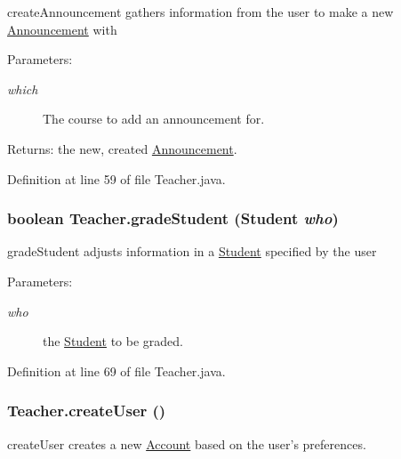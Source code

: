 createAnnouncement gathers information from the user to make a new \hyperlink{classAnnouncement}{Announcement} with 

\begin{Desc}
\item[Parameters:]
\begin{description}
\item[{\em which}]The course to add an announcement for. \end{description}
\end{Desc}
\begin{Desc}
\item[Returns:]the new, created \hyperlink{classAnnouncement}{Announcement}. \end{Desc}


Definition at line 59 of file Teacher.java.\hypertarget{classTeacher_73ab8b195a8a889009cb22a228d9e798}{
\subsubsection{\setlength{\rightskip}{0pt plus 5cm}boolean Teacher.gradeStudent ({\bf Student} {\em who})}}
\label{classTeacher_73ab8b195a8a889009cb22a228d9e798}


gradeStudent adjusts information in a \hyperlink{classStudent}{Student} specified by the user 

\begin{Desc}
\item[Parameters:]
\begin{description}
\item[{\em who}]the \hyperlink{classStudent}{Student} to be graded. \end{description}
\end{Desc}


Definition at line 69 of file Teacher.java.\hypertarget{classTeacher_4f49b057859fa1b088155706eac4fcb1}{
\subsubsection{ Teacher.createUser ()}}
\label{classTeacher_4f49b057859fa1b088155706eac4fcb1}


createUser creates a new \hyperlink{classAccount}{Account} based on the user's preferences. 

